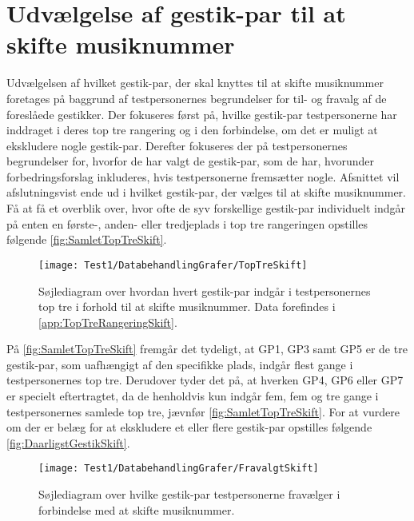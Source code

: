 \section{Udvælgelse af gestik-par til at skifte musiknummer}
\label{TestresultaterSkiftMusiknummer}
%
Udvælgelsen af hvilket gestik-par, der skal knyttes til at skifte musiknummer foretages på baggrund af testpersonernes begrundelser for til- og fravalg af de foreslåede gestikker. Der fokuseres først på, hvilke gestik-par testpersonerne har inddraget i deres top tre rangering og i den forbindelse, om det er muligt at ekskludere nogle gestik-par. Derefter fokuseres der på testpersonernes begrundelser for, hvorfor de har valgt de gestik-par, som de har, hvorunder forbedringsforslag inkluderes, hvis testpersonerne fremsætter nogle. Afsnittet vil afslutningsvist ende ud i hvilket gestik-par, der vælges til at skifte musiknummer.\blankline
%
Få at få et overblik over, hvor ofte de syv forskellige gestik-par individuelt indgår på enten en første-, anden- eller tredjeplads i top tre rangeringen opstilles følgende \autoref{fig:SamletTopTreSkift}. 
%
\begin{figure}[H]
	\centering
	\texttt{[image: Test1/DatabehandlingGrafer/TopTreSkift]}
	\caption{Søjlediagram over hvordan hvert gestik-par indgår i testpersonernes top tre i forhold til at skifte musiknummer. Data forefindes i \autoref{app:TopTreRangeringSkift}.}
	\label{fig:SamletTopTreSkift}
\end{figure}
\noindent
%
På \autoref{fig:SamletTopTreSkift} fremgår det tydeligt, at GP1, GP3 samt GP5 er de tre gestik-par, som uafhængigt af den specifikke plads, indgår flest gange i testpersonernes top tre. Derudover tyder det på, at hverken GP4, GP6 eller GP7 er specielt eftertragtet, da de henholdvis kun indgår fem, fem og tre gange i testpersonernes samlede top tre, jævnfør \autoref{fig:SamletTopTreSkift}. For at vurdere om der er belæg for at ekskludere et eller flere gestik-par opstilles følgende \autoref{fig:DaarligstGestikSkift}. 
%
\begin{figure}[H]
	\centering
	\texttt{[image: Test1/DatabehandlingGrafer/FravalgtSkift]}
	\caption{Søjlediagram over hvilke gestik-par testpersonerne fravælger i forbindelse med at skifte musiknummer.}
	\label{fig:DaarligstGestikSkift}
\end{figure}
\noindent
%
